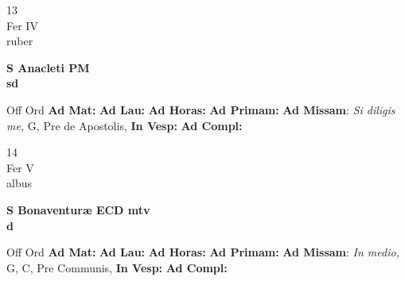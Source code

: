 \documentclass[10pt, openany]{book}
\begin{document}
        \begin{center}
            \begin{minipage}{3.5in}
                \vspace{2em}
                \begin{minipage}{0.5in}
                    {\Huge 13} \\
                    {\normalsize Fer IV} \\
                    {\normalsize ruber}
                \end{minipage}
                \begin{minipage}{3.0in}
                    \textbf{ \large S Anacleti PM \\
                    \textnormal{\normalsize sd}} \\ 
                \end{minipage}
                \begin{justify}Off Ord
                    \textbf{Ad Mat: }
                    \textbf{Ad Lau: }
                    \textbf{Ad Horas: }
                    \textbf{Ad Primam: }\textbf{Ad Missam}: \textit{Si diligis me,} G, Pre de Apostolis,  
                    \textbf{In Vesp: }
                    \textbf{Ad Compl: }
                \end{justify}
            \end{minipage}
        \end{center}
    
        \begin{center}
            \begin{minipage}{3.5in}
                \vspace{2em}
                \begin{minipage}{0.5in}
                    {\Huge 14} \\
                    {\normalsize Fer V} \\
                    {\normalsize albus}
                \end{minipage}
                \begin{minipage}{3.0in}
                    \textbf{ \large S Bonaventuræ ECD mtv \\
                    \textnormal{\normalsize d}} \\ 
                \end{minipage}
                \begin{justify}Off Ord
                    \textbf{Ad Mat: }
                    \textbf{Ad Lau: }
                    \textbf{Ad Horas: }
                    \textbf{Ad Primam: }\textbf{Ad Missam}: \textit{In medio,} G, C, Pre Communis,  
                    \textbf{In Vesp: }
                    \textbf{Ad Compl: }
                \end{justify}
            \end{minipage}
        \end{center}
    
\end{document}
